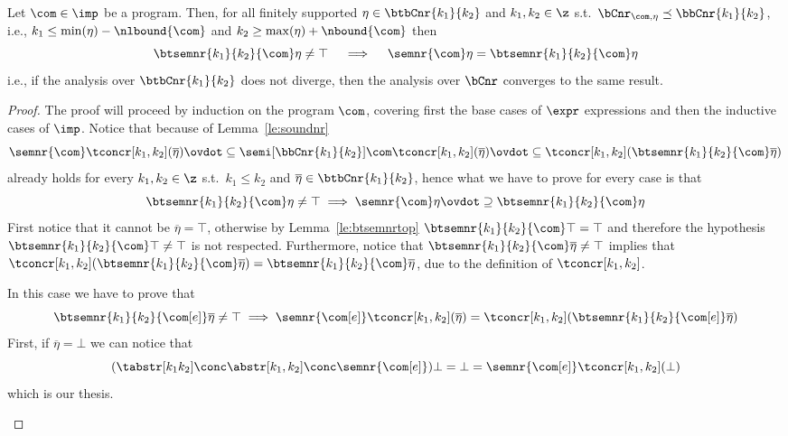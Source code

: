 \begin{theorem}
  Let \(\com\in\imp\) be a program. Then, for all finitely supported
  \(\eta \in \btbCnr{k_1}{k_2}\) and \(k_1, k_2 \in \z\) s.t.\
  \(\bCnr_{\com,\eta} \preceq \bbCnr{k_1}{k_2}\), i.e.,
  \(k_1 \leq \min(\eta) - \nlbound{\com}\) and
  \(k_2 \geq \max(\eta) + \nbound{\com}\) then
  \begin{equation*}
    \btsemnr{k_1}{k_2}{\com}\eta \neq \top
    \quad
    \implies
    \quad
    \semnr{\com}\eta = \btsemnr{k_1}{k_2}{\com}\eta
  \end{equation*}
  i.e., if the analysis over \(\btbCnr{k_1}{k_2}\) does not diverge,
  then the analysis over \(\bCnr\) converges to the same result.
\end{theorem}

\begin{proof}
  The proof will proceed by induction on the program \(\com\),
  covering first the base cases of \(\expr\) expressions and then the
  inductive cases of \(\imp\). Notice that because of
  Lemma~\ref{le:soundnr}
  \begin{equation*}
    \semnr{\com}\tconcr[k_1,k_2](\overline\eta)
    \ovdot\subseteq
    \semi[\bbCnr{k_1}{k_2}]{\com}\tconcr[k_1,k_2](\overline\eta)
    \ovdot\subseteq
    \tconcr[k_1,k_2](\btsemnr{k_1}{k_2}{\com}\overline\eta)
  \end{equation*}
  already holds for every \(k_1, k_2 \in \z\) s.t.\ \(k_1\leq k_2\)
  and \(\overline\eta \in \btbCnr{k_1}{k_2}\), hence what we have to
  prove for every case is that
  \begin{equation*}
    \btsemnr{k_1}{k_2}{\com}\eta \neq \top \implies \semnr{\com} \eta \ovdot\supseteq \btsemnr{k_1}{k_2}{\com}\eta
  \end{equation*}
  First notice that it cannot be \(\overline\eta = \top\), otherwise
  by Lemma~\ref{le:btsemnrtop} \(\btsemnr{k_1}{k_2}{\com}\top = \top\)
  and therefore the hypothesis
  \(\btsemnr{k_1}{k_2}{\com}\top \neq \top\) is not
  respected. Furthermore, notice that
  \(\btsemnr{k_1}{k_2}{\com}\overline\eta \neq \top\) implies that
  \(\tconcr[k_1,k_2](\btsemnr{k_1}{k_2}{\com}\overline\eta) =
  \btsemnr{k_1}{k_2}{\com}\overline\eta\), due to the definition of
  \(\tconcr[k_1,k_2]\).
  \begin{inductive}
    \case{\(\com[e]\)} In this case we have to prove that
    \begin{equation*}
      \btsemnr{k_1}{k_2}{\com[e]}\overline{\eta} \neq \top \implies
      \semnr{\com[e]}\tconcr[k_1,k_2](\overline\eta) = \tconcr[k_1,k_2](\btsemnr{k_1}{k_2}{\com[e]}\overline\eta)
    \end{equation*}
    First, if \(\overline\eta = \bot\) we can notice that
    \begin{equation*}
      (\tabstr[k_1k_2] \conc \abstr[k_1,k_2] \conc \semnr{\com[e]})\bot
      = \bot =
      \semnr{\com[e]}\tconcr[k_1,k_2](\bot)
    \end{equation*}
    which is our thesis.


\end{inductive}
\end{proof}
